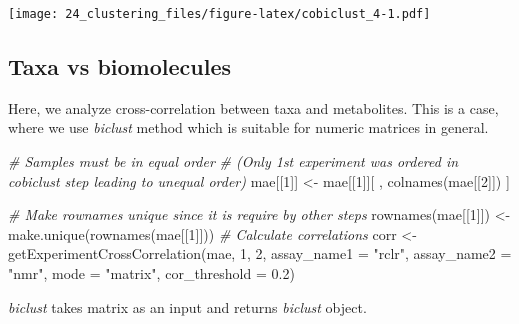 \documentclass[
]{book}
\newenvironment{Shaded}{\begin{snugshade}}{\end{snugshade}}
\newcommand{\AttributeTok}[1]{\textcolor[rgb]{0.77,0.63,0.00}{#1}}
\newcommand{\CommentTok}[1]{\textcolor[rgb]{0.56,0.35,0.01}{\textit{#1}}}
\newcommand{\DecValTok}[1]{\textcolor[rgb]{0.00,0.00,0.81}{#1}}
\newcommand{\FloatTok}[1]{\textcolor[rgb]{0.00,0.00,0.81}{#1}}
\newcommand{\FunctionTok}[1]{\textcolor[rgb]{0.00,0.00,0.00}{#1}}
\newcommand{\NormalTok}[1]{#1}
\newcommand{\OtherTok}[1]{\textcolor[rgb]{0.56,0.35,0.01}{#1}}
\newcommand{\StringTok}[1]{\textcolor[rgb]{0.31,0.60,0.02}{#1}}
\begin{document}
\texttt{[image: 24\_clustering\_files/figure-latex/cobiclust\_4-1.pdf]}

\hypertarget{taxa-vs-biomolecules}{%
\subsection{Taxa vs biomolecules}\label{taxa-vs-biomolecules}}

Here, we analyze cross-correlation between taxa and metabolites. This
is a case, where we use \emph{biclust} method which is suitable for numeric
matrices in general.

\begin{Shaded}
\begin{Highlighting}[]
\CommentTok{\# Samples must be in equal order }
\CommentTok{\# (Only 1st experiment  was ordered in cobiclust step leading to unequal order)}
\NormalTok{mae[[}\DecValTok{1}\NormalTok{]] }\OtherTok{\textless{}{-}}\NormalTok{ mae[[}\DecValTok{1}\NormalTok{]][ , }\FunctionTok{colnames}\NormalTok{(mae[[}\DecValTok{2}\NormalTok{]]) ]}

\CommentTok{\# Make rownames unique since it is require by other steps}
\FunctionTok{rownames}\NormalTok{(mae[[}\DecValTok{1}\NormalTok{]]) }\OtherTok{\textless{}{-}} \FunctionTok{make.unique}\NormalTok{(}\FunctionTok{rownames}\NormalTok{(mae[[}\DecValTok{1}\NormalTok{]]))}
\CommentTok{\# Calculate correlations}
\NormalTok{corr }\OtherTok{\textless{}{-}} \FunctionTok{getExperimentCrossCorrelation}\NormalTok{(mae, }\DecValTok{1}\NormalTok{, }\DecValTok{2}\NormalTok{, }
                                      \AttributeTok{assay\_name1 =} \StringTok{"rclr"}\NormalTok{, }
                                      \AttributeTok{assay\_name2 =} \StringTok{"nmr"}\NormalTok{, }
                                      \AttributeTok{mode =} \StringTok{"matrix"}\NormalTok{, }
                                      \AttributeTok{cor\_threshold =} \FloatTok{0.2}\NormalTok{)}
\end{Highlighting}
\end{Shaded}

\emph{biclust} takes matrix as an input and returns \emph{biclust} object.
\end{document}
